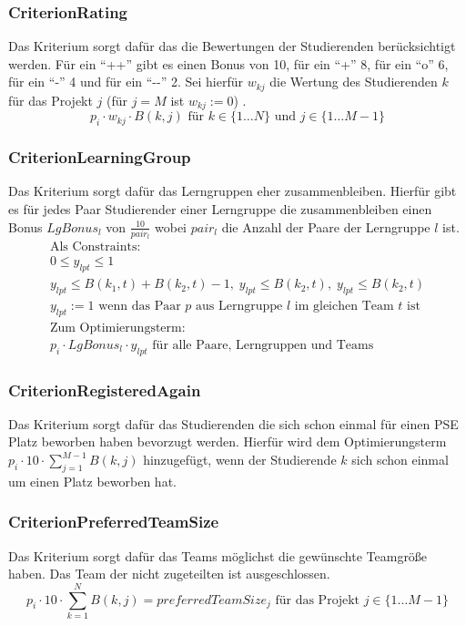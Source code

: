 \documentclass[parskip=full]{scrartcl}
\begin{document}
\subsubsection{CriterionRating}
Das Kriterium sorgt dafür das die Bewertungen der Studierenden berücksichtigt
werden. Für ein \enquote{++} gibt es einen Bonus von 10, für ein \enquote{+} 8,
für ein \enquote{o} 6, für ein \enquote{-} 4 und für ein \enquote{-{}-} 2. Sei
hierfür $w_{kj}$ die Wertung des Studierenden $k$ für das Projekt $j$ (für $j =
M$ ist $w_{kj} := 0$) .
\begin{equation*}
p_i \cdot w_{kj} \cdot B(k,j) \text{ für } k \in \{ 1\ldots N \} \text{ und }j
\in \{ 1\ldots M -1 \}
\end{equation*}

\subsubsection{CriterionLearningGroup}
Das Kriterium sorgt dafür das Lerngruppen eher zusammenbleiben. Hierfür gibt es
für jedes Paar Studierender einer Lerngruppe die zusammenbleiben einen Bonus
$LgBonus_l$ von $\frac{10}{pair_l}$ wobei $pair_l$ die Anzahl der Paare der
Lerngruppe $l$ ist.
\begin{gather*}
\text{Als Constraints: }\\
0 \le y_{lpt} \le 1  \\
y_{lpt} \le B(k_1,t) + B(k_2,t) -1, \; y_{lpt} \le B(k_2,t), \; y_{lpt} \le
B(k_2,t) \\
\text{$y_{lpt} := 1$ wenn das Paar $p$ aus
Lerngruppe $l$ im gleichen Team $t$ ist} \\
\text{Zum Optimierungsterm: } \\
p_i \cdot LgBonus_l \cdot y_{lpt} \text{ für alle Paare, Lerngruppen und Teams}
\end{gather*} 

\subsubsection{CriterionRegisteredAgain}
Das Kriterium sorgt dafür das Studierenden die sich schon einmal für einen PSE
Platz beworben haben bevorzugt werden. Hierfür wird dem Optimierungsterm
$p_i \cdot 10 \cdot \sum_{j = 1}^{M-1} B(k,j)$ hinzugefügt, wenn der
Studierende $k$ sich schon einmal um einen Platz beworben hat.
\subsubsection{CriterionPreferredTeamSize}
Das Kriterium sorgt dafür das Teams möglichst die gewünschte Teamgröße haben.
Das Team der nicht zugeteilten ist ausgeschlossen.
\begin{equation*}
p_i \cdot 10 \cdot \sum_{k = 1}^{N} B(k,j) = preferredTeamSize_j
\text{ für das Projekt }  j \in \{ 1\ldots M-1 \} %
\end{equation*}
\end{document}
